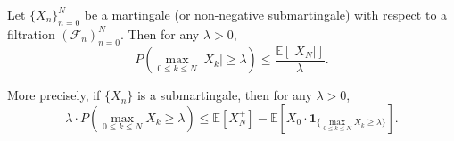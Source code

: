 \begin{theorem} \label{theorem:doobs_inequality}
Let $\{X_n\}_{n=0}^N$ be a martingale (or non-negative submartingale) with respect to a filtration $(\mathcal{F}_n)_{n=0}^N$. Then for any $\lambda > 0$,
$$P\left(\max_{0 \leq k \leq N} |X_k| \geq \lambda\right) \leq \frac{\mathbb{E}[|X_N|]}{\lambda}.$$

More precisely, if $\{X_n\}$ is a submartingale, then for any $\lambda > 0$,
$$\lambda \cdot P\left(\max_{0 \leq k \leq N} X_k \geq \lambda\right) \leq \mathbb{E}[X_N^+] - \mathbb{E}[X_0 \cdot \mathbf{1}_{\{\max_{0 \leq k \leq N} X_k \geq \lambda\}}].$$
\end{theorem}
